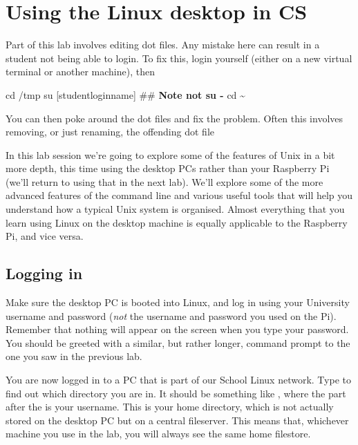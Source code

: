 \chapter{Using the Linux desktop in CS}

\minitoc


\begin{demonote}
  Part of this lab involves editing dot files. Any mistake here can result in a student not being able to login. To fix this, login yourself (either on a new virtual terminal or another machine), then
  \begin{ttoutenv}
    cd /tmp
    su [studentloginname]  ## \textbf{Note not su -}
    cd \textasciitilde
  \end{ttoutenv}
  You can then poke around the dot files and fix the problem. Often this involves removing, or just renaming, the offending dot file

\end{demonote}

In this lab session we're going to explore some of the features of Unix in a bit more depth, this time using the desktop PCs rather than your Raspberry Pi (we'll return to using that in the next lab). We'll explore some of the more advanced features of the command line and various useful tools that will help you understand how a typical Unix system is organised. Almost everything that you learn using Linux on the desktop machine is equally applicable to the Raspberry Pi, and vice versa.

\section{Logging in}

 Make sure the desktop PC is booted into Linux, and log in using your University username and password (\emph{not} the username and password you used on the Pi). Remember that nothing will appear on the screen when you type your password. You should be greeted with a similar, but rather longer, command prompt to the one you saw in the previous lab.

 You are now logged in to a PC that is part of our School Linux network. Type  to find out which directory you are in. It should be something like , where the part after the  is your username. This is your home directory, which is not actually stored on the desktop PC but on a central fileserver. This means that, whichever machine you use in the lab, you will always see the same home filestore.

